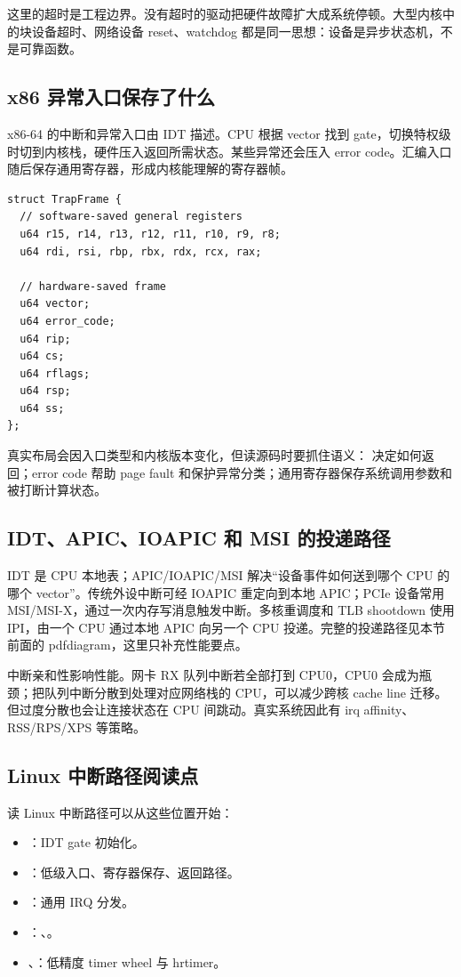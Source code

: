 这里的超时是工程边界。没有超时的驱动把硬件故障扩大成系统停顿。大型内核中的块设备超时、网络设备 reset、watchdog 都是同一思想：设备是异步状态机，不是可靠函数。

\subsection{x86 异常入口保存了什么}

x86-64 的中断和异常入口由 IDT 描述。CPU 根据 vector 找到 gate，切换特权级时切到内核栈，硬件压入返回所需状态。某些异常还会压入 error code。汇编入口随后保存通用寄存器，形成内核能理解的寄存器帧。

\begin{lstlisting}
struct TrapFrame {
  // software-saved general registers
  u64 r15, r14, r13, r12, r11, r10, r9, r8;
  u64 rdi, rsi, rbp, rbx, rdx, rcx, rax;

  // hardware-saved frame
  u64 vector;
  u64 error_code;
  u64 rip;
  u64 cs;
  u64 rflags;
  u64 rsp;
  u64 ss;
};
\end{lstlisting}

真实布局会因入口类型和内核版本变化，但读源码时要抓住语义： 决定如何返回；error code 帮助 page fault 和保护异常分类；通用寄存器保存系统调用参数和被打断计算状态。

\subsection{IDT、APIC、IOAPIC 和 MSI 的投递路径}

IDT 是 CPU 本地表；APIC/IOAPIC/MSI 解决“设备事件如何送到哪个 CPU 的哪个 vector”。传统外设中断可经 IOAPIC 重定向到本地 APIC；PCIe 设备常用 MSI/MSI-X，通过一次内存写消息触发中断。多核重调度和 TLB shootdown 使用 IPI，由一个 CPU 通过本地 APIC 向另一个 CPU 投递。完整的投递路径见本节前面的 pdfdiagram，这里只补充性能要点。

中断亲和性影响性能。网卡 RX 队列中断若全部打到 CPU0，CPU0 会成为瓶颈；把队列中断分散到处理对应网络栈的 CPU，可以减少跨核 cache line 迁移。但过度分散也会让连接状态在 CPU 间跳动。真实系统因此有 irq affinity、RSS/RPS/XPS 等策略。

\subsection{Linux 中断路径阅读点}

读 Linux 中断路径可以从这些位置开始：

\begin{itemize}
\tightlist
\item {}：IDT gate 初始化。
\item {}：低级入口、寄存器保存、返回路径。
\item {}：通用 IRQ 分发。
\item {}：、。
\item {}、：低精度 timer wheel 与 hrtimer。
\end{itemize}

